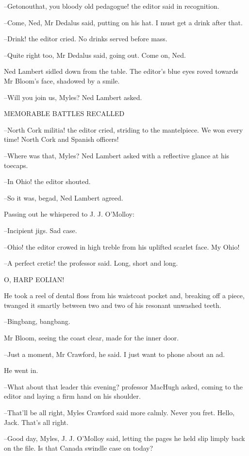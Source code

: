 --Getonouthat, you bloody old pedagogue! the editor said in recognition.

--Come, Ned, Mr Dedalus said, putting on his hat. I must get a drink
after that.

--Drink! the editor cried. No drinks served before mass.

--Quite right too, Mr Dedalus said, going out. Come on, Ned.

Ned Lambert sidled down from the table. The editor's blue eyes roved
towards Mr Bloom's face, shadowed by a smile.

--Will you join us, Myles? Ned Lambert asked.


    MEMORABLE BATTLES RECALLED


--North Cork militia! the editor cried, striding to the mantelpiece. We
won every time! North Cork and Spanish officers!

--Where was that, Myles? Ned Lambert asked with a reflective glance at
his toecaps.

--In Ohio! the editor shouted.

--So it was, begad, Ned Lambert agreed.

Passing out he whispered to J. J. O'Molloy:

--Incipient jigs. Sad case.

--Ohio! the editor crowed in high treble from his uplifted scarlet face.
My Ohio!

--A perfect cretic! the professor said. Long, short and long.


    O, HARP EOLIAN!


He took a reel of dental floss from his waistcoat pocket and, breaking
off a piece, twanged it smartly between two and two of his resonant
unwashed teeth.

--Bingbang, bangbang.

Mr Bloom, seeing the coast clear, made for the inner door.

--Just a moment, Mr Crawford, he said. I just want to phone about an ad.

He went in.

--What about that leader this evening? professor MacHugh asked, coming
to the editor and laying a firm hand on his shoulder.

--That'll be all right, Myles Crawford said more calmly. Never you fret.
Hello, Jack. That's all right.

--Good day, Myles, J. J. O'Molloy said, letting the pages he held slip
limply back on the file. Is that Canada swindle case on today?

